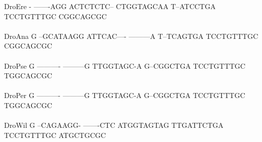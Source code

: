 \documentclass[11pt,twoside,reqno,a4paper]{article}
\begin{document}
{DroEre	-	-------AGG	ACTCTCTC--	CTGGTAGCAA	T--ATCCTGA	TCCTGTTTGC	CGGCAGCGC\\
\hspace*{7\charwidth}\hspace*{1\charwidth}\hspace*{1\charwidth}\hspace*{1\charwidth}\hspace*{1\charwidth}\hspace*{1\charwidth}\hspace*{1\charwidth}\\
DroAna	G	--GCATAAGG	ATTCAC----	---------A	T--TCAGTGA	TCCTGTTTGC	CGGCAGCGC\\
\hspace*{7\charwidth}\hspace*{1\charwidth}\hspace*{1\charwidth}\hspace*{1\charwidth}\hspace*{1\charwidth}\hspace*{1\charwidth}\hspace*{1\charwidth}\\
DroPse	G	----------	---------G	TTGGTAGC-A	G--CGGCTGA	TCCTGTTTGC	TGGCAGCGC\\
\hspace*{7\charwidth}\hspace*{1\charwidth}\hspace*{1\charwidth}\hspace*{1\charwidth}\hspace*{1\charwidth}\hspace*{1\charwidth}\hspace*{1\charwidth}\\
DroPer	G	----------	---------G	TTGGTAGC-A	G--CGGCTGA	TCCTGTTTGC	TGGCAGCGC\\
\hspace*{7\charwidth}\hspace*{1\charwidth}\hspace*{1\charwidth}\hspace*{1\charwidth}\hspace*{1\charwidth}\hspace*{1\charwidth}\hspace*{1\charwidth}\\
DroWil	G	--CAGAAGG-	-------CTC	ATGGTAGTAG	TTGATTCTGA	TCCTGTTTGC	ATGCTGCGC\\
\hspace*{7\charwidth}\hspace*{1\charwidth}\hspace*{1\charwidth}\hspace*{1\charwidth}\hspace*{1\charwidth}\hspace*{1\charwidth}\hspace*{1\charwidth}\\
}
\end{document}
